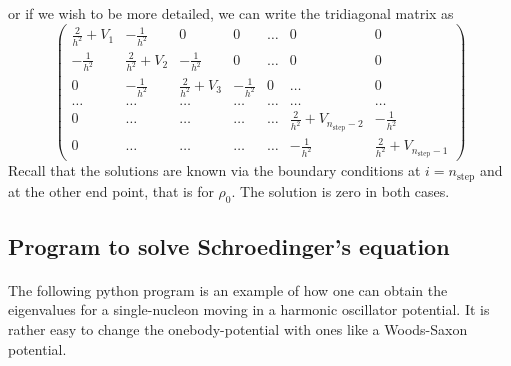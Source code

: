\documentclass[%
twoside,                 %
final,                   %
10pt]{article}
\begin{document}
or if we wish to be more detailed, we can write the tridiagonal matrix as
\begin{equation}
    \left( \begin{array}{ccccccc} \frac{2}{h^2}+V_1 & -\frac{1}{h^2} & 0   & 0    & \dots  &0     & 0 \\
                                -\frac{1}{h^2} & \frac{2}{h^2}+V_2 & -\frac{1}{h^2} & 0    & \dots  &0     &0 \\
                                0   & -\frac{1}{h^2} & \frac{2}{h^2}+V_3 & -\frac{1}{h^2}  &0       &\dots & 0\\
                                \dots  & \dots & \dots & \dots  &\dots      &\dots & \dots\\
                                0   & \dots & \dots & \dots  &\dots       &\frac{2}{h^2}+V_{n_{\mathrm{step}}-2} & -\frac{1}{h^2}\\
                                0   & \dots & \dots & \dots  &\dots       &-\frac{1}{h^2} & \frac{2}{h^2}+V_{n_{\mathrm{step}}-1}

             \end{array} \right)  
\label{eq:matrixse} 
\end{equation} 
Recall that the solutions are known via the boundary conditions at
$i=n_{\mathrm{step}}$ and at the other end point, that is for  $\rho_0$.
The solution is zero in both cases.




\subsection*{Program to solve Schroedinger's equation}

\paragraph{}
The following python program is an example of how one can obtain the eigenvalues for a single-nucleon moving in a harmonic oscillator potential. It is rather easy to change the onebody-potential with ones like a Woods-Saxon potential. 
\end{document}

